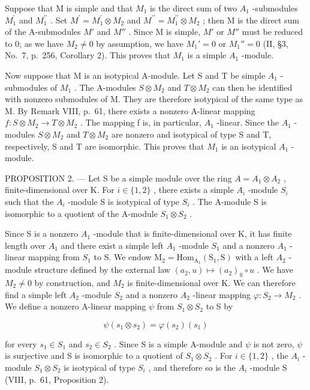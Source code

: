 Suppose that M is simple and that \(M_{1}\) is the direct sum of two \(A_{1}\) -submodules \(M_{1}^{\prime}\) and \(M_{1}^{\prime\prime}\) . Set \(M^{\prime}=M_{1}^{\prime}\otimes M_{2}\) and \(M^{\prime\prime}=M_{1}^{\prime\prime}\otimes M_{2}\) ; then M is the direct sum of the A-submodules \(M'\) and \(M''\) . Since M is simple, \(M'\) or \(M''\) must be reduced to 0; as we have \(M_{2} \neq 0\) by assumption, we have \(M_{1}' = 0\) or \(M_{1}'' = 0\) (II, §3, No.~7, p.~256, Corollary 2). This proves that \(M_{1}\) is a simple \(A_{1}\) -module.

Now suppose that M is an isotypical A-module. Let S and T be simple \(A_{1}\) -submodules of \(M_{1}\) . The A-modules \(S \otimes M_{2}\) and \(T \otimes M_{2}\) can then be identified with nonzero submodules of M. They are therefore isotypical of the same type as M. By Remark VIII, p.~61, there exists a nonzero A-linear mapping \(f : S \otimes M_{2} \to T \otimes M_{2}\) . The mapping f is, in particular, \(A_{1}\) -linear. Since the \(A_{1}\) -modules \(S \otimes M_{2}\) and \(T \otimes M_{2}\) are nonzero and isotypical of type S and T, respectively, S and T are isomorphic. This proves that \(M_{1}\) is an isotypical \(A_{1}\) -module.

PROPOSITION 2. --- Let S be a simple module over the ring \(A = A_{1} \otimes A_{2}\) , finite-dimensional over K. For \(i \in \{1, 2\}\) , there exists a simple \(A_{i}\) -module \(S_{i}\) such that the \(A_{i}\) -module S is isotypical of type \(S_{i}\) . The A-module S is isomorphic to a quotient of the A-module \(S_{1} \otimes S_{2}\) .

Since S is a nonzero \(A_{1}\) -module that is finite-dimensional over K, it has finite length over \(A_{1}\) and there exist a simple left \(A_{1}\) -module \(S_{1}\) and a nonzero \(A_{1}\) -linear mapping from \(S_{1}\) to S. We endow \(\mathrm{M}_{2} = \mathrm{Hom}_{\mathrm{A}_{1}}(\mathrm{S}_{1}, \mathrm{S})\) with a left \(A_{2}\) -module structure defined by the external law \((a_{2}, u) \mapsto (a_{2})_{\mathrm{S}} \circ u\) . We have \(M_{2} \neq 0\) by construction, and \(M_{2}\) is finite-dimensional over K. We can therefore find a simple left \(A_{2}\) -module \(S_{2}\) and a nonzero \(A_{2}\) -linear mapping \(\varphi : S_{2} \to M_{2}\) . We define a nonzero A-linear mapping \(\psi\) from \(S_{1} \otimes S_{2}\) to S by

\[
\psi (s _ {1} \otimes s _ {2}) = \varphi (s _ {2}) (s _ {1})\tag{1}
\]

for every \(s_{1} \in S_{1}\) and \(s_{2} \in S_{2}\) . Since S is a simple A-module and \(\psi\) is not zero, \(\psi\) is surjective and S is isomorphic to a quotient of \(S_{1} \otimes S_{2}\) . For \(i \in \{1, 2\}\) , the \(A_{i}\) -module \(S_{1} \otimes S_{2}\) is isotypical of type \(S_{i}\) , and therefore so is the \(A_{i}\) -module S (VIII, p.~61, Proposition 2).

